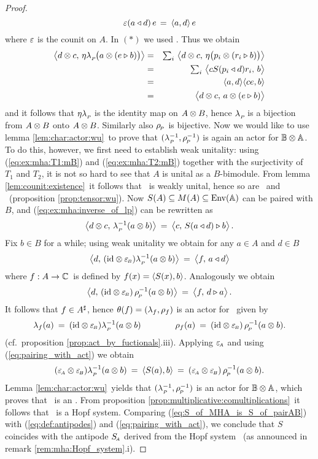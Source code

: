 \begin{proof}
$$    \varepsilon(a\triangleleft d) \, e
    \,=\:
    \langle a,d \rangle \, e  $$
where $\varepsilon$ is the counit on $A$.
In $(*)$ we used \cite[definition 4.1]{Fons:MHA}\@. Thus we obtain
\begin{eqnarray*}
\pairM{d \tens c}{\eta\lp \! \left(a \tens (e\lact b) \vertM\right)}
  &=&
\textstyle \sum_i \, \pairM{d \tens c}{\eta \! \left(p_i \tens (r_i \lact b) \vertM\right)}
\\&=&
\textstyle \sum_i \, \pairM{c S(p_i \ract d) r_i}{b}
\\&=&
\pair{a}{d} \pair{ce}{b}
\\&=&
\pairM{d \tens c}{a \tens (e\lact b)}
\end{eqnarray*}
and it follows that $\eta\lambda_{_P\!}$ is the identity map on $A\otimes B$, hence $\lambda_{_P\!}$ is
a bijection from $A\otimes B$ onto $A\otimes B$.
Similarly also $\rho_{_{\!P}}$ is bijective.
Now we would like to use lemma \ref{lem:char:actor:wu}\ to prove that
$(\lambda_{_P\!}^{-1},\rho_{_{\!P}}^{-1})$ is again an actor for $\mathbb{B} \otimes \mathbb{A}$. To do this, however,
we first need to establish weak unitality:
using (\ref{eq:ex:mha:T1:mB}) and (\ref{eq:ex:mha:T2:mB})
together with the surjectivity of $T_1$ and $T_2$, it is not so hard to see that
$A$ is unital as a $B$-bimodule.
From lemma \ref{lem:counit:existence}\ it follows that \BBAA\ is weakly unital,
hence so are \Aa\ and \BB\ (proposition \ref{prop:tensor:wu}).
Now $S(A)\subseteq M(A) \subseteq \mbox{\rm Env}(\mathbb{A})$ can be paired with $B$,
and (\ref{eq:ex:mha:inverse_of_lp}) can be rewritten as
$$ \pairM{d \tens c}{\lp^{-1}(a \tens b)} \:=\: \pairM{c}{S(a \ract d) \lact b}. $$
Fix $b\in B$ for a while; using weak unitality we obtain for any $a\in A$ and $d\in B$
$$ \pairM{d}{(\id \tens \epsB)\lp^{-1}(a \tens b)}  \:=\: \pairM{f}{a \ract d} $$
where $f:A\rightarrow \mathbb{C}\,$ is defined by $f(x)=\langle S(x),b \rangle$.
Analogously we obtain
$$ \pairM{d}{(\id \tens \epsB)\, \rp^{-1}(a \tens b)}  \:=\: \pairM{f}{d \lact a}. $$
It follows that $f \in A^\sharp$, hence $\theta(f) = (\lambda_f,\rho_f)$
is an actor for \BB\ given by
$$ \lambda_f(a) \:=\: (\mbox{\rm id} \otimes \varepsilon_{\scriptscriptstyle \! B})\lambda_{_P\!}^{-1}(a \otimes b)    \hspace{4em}
   \rho_f(a) \:=\: (\mbox{\rm id} \otimes \varepsilon_{\scriptscriptstyle \! B})\,\rho_{_{\!P}}^{-1}(a \otimes b).  $$
(cf.\ proposition \ref{prop:act_by_fuctionals}.iii).
Applying $\varepsilon_{\scriptscriptstyle \! A}$ and using (\ref{eq:pairing_with_act}) we obtain
\begin{equation}\label{eq:S_of_MHA_is_S_of_pairAB}
  (\varepsilon_{\scriptscriptstyle \! A} \otimes \varepsilon_{\scriptscriptstyle \! B}) \lambda_{_P\!}^{-1}(a \otimes b)
       \:=\: \langle S(a),b \rangle
       \:=\: (\varepsilon_{\scriptscriptstyle \! A} \otimes \varepsilon_{\scriptscriptstyle \! B})\, \rho_{_{\!P}}^{-1}(a \otimes b).
\end{equation}
Lemma \ref{lem:char:actor:wu}\ yields that $(\lambda_{_P\!}^{-1},\rho_{_{\!P}}^{-1})$ is an
actor for $\mathbb{B} \otimes \mathbb{A}$, which proves that \ is an \idpa\@.
From proposition \ref{prop:multiplicative:comultiplications}\ it follows that
\ is a Hopf system.
Comparing (\ref{eq:S_of_MHA_is_S_of_pairAB}) with (\ref{eq:def:antipodes})
and (\ref{eq:pairing_with_act}),
we conclude that $S$ coincides with the antipode $S_{\scriptscriptstyle \! A}$ derived from the
Hopf system \pairAB\ (as announced in remark \ref{rem:mha:Hopf_system}.i).


\end{proof}
